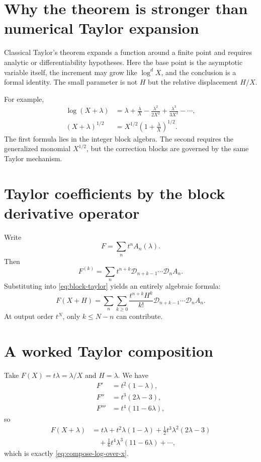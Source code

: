 \documentclass[11pt,openany]{book}
\theoremstyle{definition}
\theoremstyle{plain}
\theoremstyle{remark}
\begin{document}
\section{Why the theorem is stronger than numerical Taylor expansion}
Classical Taylor's theorem expands a function around a finite point and requires analytic or differentiability hypotheses. Here the base point is the asymptotic variable itself, the increment may grow like \(\log^d X\), and the conclusion is a formal identity. The small parameter is not \(H\) but the relative displacement \(H/X\).

For example,
\begin{align*}
 \log(X+\lambda)
 &=\lambda+\frac{\lambda}{X}-\frac{\lambda^2}{2X^2}
 +\frac{\lambda^3}{3X^3}-\cdots,\\
 (X+\lambda)^{1/2}
 &=X^{1/2}\left(1+\frac{\lambda}{X}\right)^{1/2}.
\end{align*}
The first formula lies in the integer block algebra. The second requires the generalized monomial \(X^{1/2}\), but the correction blocks are governed by the same Taylor mechanism.

\section{Taylor coefficients by the block derivative operator}
Write
\[
 F=\sum_n t^nA_n(\lambda).
\]
Then
\[
 F^{(k)}=\sum_n t^{n+k}
 \mathcal D_{n+k-1}\cdots\mathcal D_n A_n.
\]
Substituting into \cref{eq:block-taylor} yields an entirely algebraic formula:
\begin{equation}\label{eq:taylor-block-operator}
 F(X+H)=
 \sum_{n}\sum_{k\ge0}
 \frac{t^{n+k}H^k}{k!}
 \mathcal D_{n+k-1}\cdots\mathcal D_n A_n.
\end{equation}
At output order \(t^N\), only \(k\le N-n\) can contribute.

\section{A worked Taylor composition}
Take \(F(X)=t\lambda=\lambda/X\) and \(H=\lambda\). We have
\begin{align*}
 F'&=t^2(1-\lambda),\\
 F''&=t^3(2\lambda-3),\\
 F'''&=t^4(11-6\lambda),
\end{align*}
so
\begin{align*}
 F(X+\lambda)
 & =t\lambda+t^2\lambda(1-\lambda)
 +\frac12t^3\lambda^2(2\lambda-3)\\
 &\quad+\frac16t^4\lambda^3(11-6\lambda)+\cdots,
\end{align*}
which is exactly \cref{eq:compose-log-over-x}.
\end{document}
